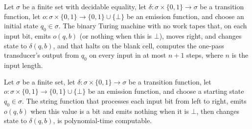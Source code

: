 \begin{theorem}
\label{Complexity.transducerTM_computes}
\leanok
{}
Let $\sigma$ be a finite set with decidable equality, let
$\delta:\sigma\times\{0,1\}\to\sigma$ be a transition function, let
$o:\sigma\times\{0,1\}\to\{0,1\}\cup\{\bot\}$ be an emission function, and choose an
initial state $q_0\in\sigma$. The binary Turing machine with no work tapes that, on each
input bit, emits $o(q,b)$ (or nothing when this is $\bot$), moves right, and changes
state to $\delta(q,b)$, and that halts on the blank cell, computes the one-pass
transducer's output from $q_0$ on every input in at most $n+1$ steps, where $n$ is the
input length.
\end{theorem}

\begin{theorem}
\label{Complexity.polyTimeComputable_transduce}
\leanok
{}
Let $\sigma$ be a finite set, let $\delta : \sigma \times \{0,1\} \to \sigma$ be a
transition function, let $o : \sigma \times \{0,1\} \to \{0,1\} \cup \{\bot\}$ be an
emission function, and choose a starting state $q_0 \in \sigma$. The string function
that processes each input bit from left to right, emits $o(q,b)$ when this value is a
bit and emits nothing when it is $\bot$, then changes state to $\delta(q,b)$, is
polynomial-time computable.
\end{theorem}
